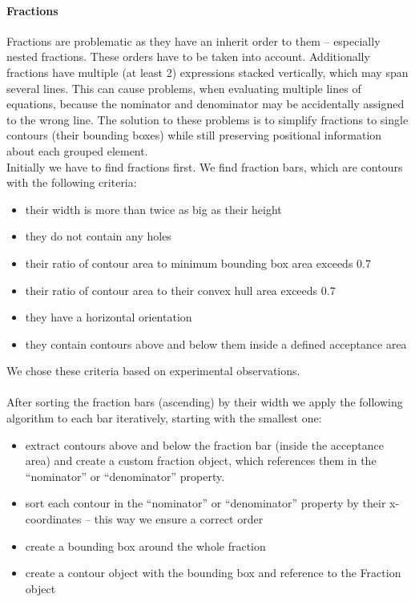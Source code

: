 \documentclass[12pt]{article}
\begin{document}
	\paragraph{Fractions}
	Fractions are problematic as they have an inherit order to them – especially nested fractions.
	These orders have to be taken into account. Additionally fractions have multiple (at least 2) expressions stacked vertically, which may span several lines.
	This can cause problems, when evaluating multiple lines of equations, because the nominator and denominator may be accidentally assigned to the wrong line.
	The solution to these problems is to simplify fractions to single contours (their bounding boxes) while still preserving positional information about each grouped element.\\
	Initially we have to find fractions first. We find fraction bars, which are contours with the following criteria:
	\begin{itemize}
		\item their width is more than twice as big as their height
		\item they do not contain any holes
		\item their ratio of contour area to minimum bounding box area exceeds 0.7
		\item their ratio of contour area to their convex hull area exceeds 0.7
		\item they have a horizontal orientation
		\item they contain contours above and below them inside a defined acceptance area
	\end{itemize}
	We chose these criteria based on experimental observations.\\\\
	After sorting the fraction bars (ascending) by their width we apply the following algorithm to each bar iteratively, starting with the smallest one:
	\begin{itemize}
		\item extract contours above and below the fraction bar (inside the acceptance area) and create a custom fraction object, which references them in the “nominator” or “denominator” property.
		\item sort each contour in the “nominator” or “denominator” property by their x-coordinates – this way we ensure a correct order
		\item create a bounding box around the whole fraction
		\item create a contour object with the bounding box and reference to the Fraction object
	\end{itemize}
\end{document}
